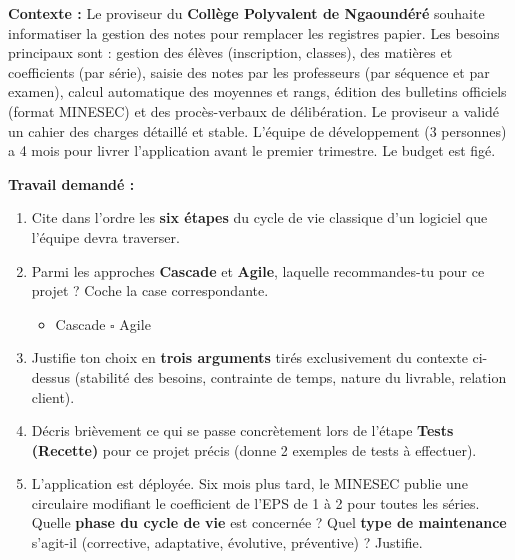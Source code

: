 \documentclass[11pt]{article}
\begin{document}
\begin{exercice}
\textbf{Contexte :} Le proviseur du \textbf{Collège Polyvalent de Ngaoundéré} souhaite informatiser la gestion des notes pour remplacer les registres papier. Les besoins principaux sont : gestion des élèves (inscription, classes), des matières et coefficients (par série), saisie des notes par les professeurs (par séquence et par examen), calcul automatique des moyennes et rangs, édition des bulletins officiels (format MINESEC) et des procès-verbaux de délibération. Le proviseur a validé un cahier des charges détaillé et stable. L'équipe de développement (3 personnes) a 4 mois pour livrer l'application avant le premier trimestre. Le budget est figé.

\textbf{Travail demandé :}
\begin{enumerate}
    \item Cite dans l'ordre les \textbf{six étapes} du cycle de vie classique d'un logiciel que l'équipe devra traverser.
    \item Parmi les approches \textbf{Cascade} et \textbf{Agile}, laquelle recommandes-tu pour ce projet ? Coche la case correspondante.
    \begin{itemize}
        \item[$\square$] Cascade \quad $\square$ Agile
    \end{itemize}
    \item Justifie ton choix en \textbf{trois arguments} tirés exclusivement du contexte ci-dessus (stabilité des besoins, contrainte de temps, nature du livrable, relation client).
    \item Décris brièvement ce qui se passe concrètement lors de l'étape \textbf{Tests (Recette)} pour ce projet précis (donne 2 exemples de tests à effectuer).
    \item L'application est déployée. Six mois plus tard, le MINESEC publie une circulaire modifiant le coefficient de l'EPS de 1 à 2 pour toutes les séries. Quelle \textbf{phase du cycle de vie} est concernée ? Quel \textbf{type de maintenance} s'agit-il (corrective, adaptative, évolutive, préventive) ? Justifie.
\end{enumerate}
\end{exercice}
\end{document}
